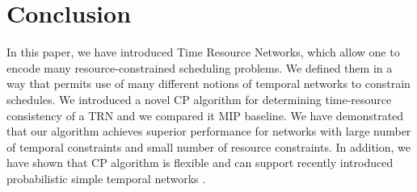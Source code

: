 \documentclass{article}
\begin{document}
\section{Conclusion}
In this paper, we have introduced Time Resource Networks, which allow one to encode many resource-constrained scheduling problems. We defined them in a way that permits use of many different notions of temporal networks to constrain schedules. We introduced a novel CP algorithm for determining time-resource consistency of a TRN and we compared it MIP baseline. We have demonstrated that our algorithm achieves superior performance for networks with large number of temporal constraints and small number of resource constraints. In addition, we have shown that CP algorithm is flexible and can support recently introduced probabilistic simple temporal networks \cite{Fang2014}.




\end{document}
